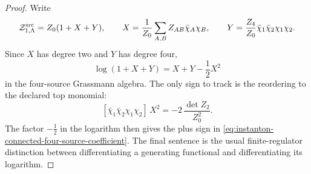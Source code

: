 \begin{proof}
Write
\[
  \mathcal Z_{1,\Lambda}^{\rm src}
  =
  Z_0(1+X+Y),
  \qquad
  X=\frac1{Z_0}\sum_{A,B}Z_{AB}\bar\chi_A\chi_B,\qquad
  Y=\frac{Z_4}{Z_0}\bar\chi_1\bar\chi_2\chi_1\chi_2 .
\]
Since \(X\) has degree two and \(Y\) has degree four,
\[
  \log(1+X+Y)=X+Y-\frac12X^2
\]
in the four-source Grassmann algebra.  The only sign to track is the
reordering to the declared top monomial:
\[
  [\bar\chi_1\bar\chi_2\chi_1\chi_2]\,X^2
  =
  -2\,\frac{\det Z_2}{Z_0^2}.
\]
The factor \(-\frac12\) in the logarithm then gives the plus sign in
\eqref{eq:instanton-connected-four-source-coefficient}.  The final sentence is
the usual finite-regulator distinction between differentiating a generating
functional and differentiating its logarithm.
\end{proof}

